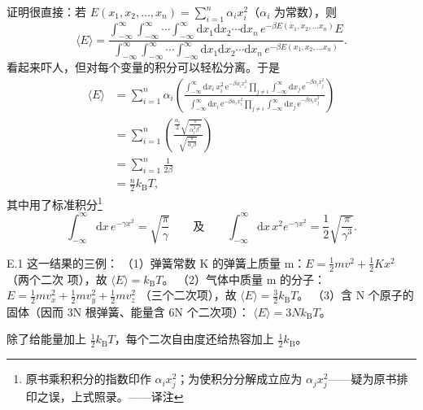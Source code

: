 证明很直接：若 $E(x_1,x_2,\ldots,x_n)=\sum_{i=1}^{n}\alpha_ix_i^{2}$（$\alpha_i$
为常数），则
\begin{equation*}
\langle E\rangle = \frac{\int_{-\infty}^{\infty}\int_{-\infty}^{\infty}\cdots\int_{-\infty}^{\infty}\mathrm{d}x_1\mathrm{d}x_2\cdots\mathrm{d}x_n\,e^{-\beta E(x_1,x_2,\ldots x_n)}E}{\int_{-\infty}^{\infty}\int_{-\infty}^{\infty}\cdots\int_{-\infty}^{\infty}\mathrm{d}x_1\mathrm{d}x_2\cdots\mathrm{d}x_n\,e^{-\beta E(x_1,x_2,\ldots x_n)}}.\tag{E.14}
\end{equation*}
看起来吓人，但对每个变量的积分可以轻松分离。于是
\begin{align*}
\langle E\rangle &= \sum_{i=1}^{n}\alpha_i\left(\frac{\int_{-\infty}^{\infty}\mathrm{d}x_i\,x_i^{2}\,\mathrm{e}^{-\beta\alpha_ix_i^{2}}\prod_{j\neq i}\int_{-\infty}^{\infty}\mathrm{d}x_j\,\mathrm{e}^{-\beta\alpha_ix_j^{2}}}{\int_{-\infty}^{\infty}\mathrm{d}x_i\,\mathrm{e}^{-\beta\alpha_ix_i^{2}}\prod_{j\neq i}\int_{-\infty}^{\infty}\mathrm{d}x_j\,\mathrm{e}^{-\beta\alpha_ix_j^{2}}}\right)\\
&= \sum_{i=1}^{n}\left(\frac{\frac{\alpha_i}{2}\sqrt{\frac{\pi}{\alpha_i^{3}\beta^{3}}}}{\sqrt{\frac{\pi}{\alpha_i\beta}}}\right)\\
&= \sum_{i=1}^{n}\frac{1}{2\beta}\\
&= \frac{n}{2}k_{\mathrm{B}}T,\tag{E.15}
\end{align*}
其中用了标准积分\footnote{原书乘积积分的指数印作 $\alpha_i x_j^{2}$；为使积分分解成立应为 $\alpha_j x_j^{2}$——疑为原书排印之误，上式照录。——译注}
\begin{equation*}
\int_{-\infty}^{\infty}\mathrm{d}x\,e^{-\gamma x^{2}} = \sqrt{\frac{\pi}{\gamma}} \qquad\text{及}\qquad \int_{-\infty}^{\infty}\mathrm{d}x\,x^{2}e^{-\gamma x^{2}} = \frac{1}{2}\sqrt{\frac{\pi}{\gamma^{3}}}.\tag{E.16}
\end{equation*}

\begin{example}{E.1}
这一结果的三例：
（1）弹簧常数 K 的弹簧上质量 m：$E=\frac{1}{2}mv^{2}+\frac{1}{2}Kx^{2}$（两个二次
项），故 $\langle E\rangle=k_{\mathrm{B}}T$。
（2）气体中质量 m 的分子：$E=\frac{1}{2}mv_x^{2}+\frac{1}{2}mv_y^{2}+\frac{1}{2}mv_z^{2}$
（三个二次项），故 $\langle E\rangle=\frac{3}{2}k_{\mathrm{B}}T$。
（3）含 N 个原子的固体（因而 3N 根弹簧、能量含 6N 个二次项）：
$\langle E\rangle=3Nk_{\mathrm{B}}T$。
\end{example}

除了给能量加上 $\frac{1}{2}k_{\mathrm{B}}T$，每个二次自由度还给热容加上
$\frac{1}{2}k_{\mathrm{B}}$。

